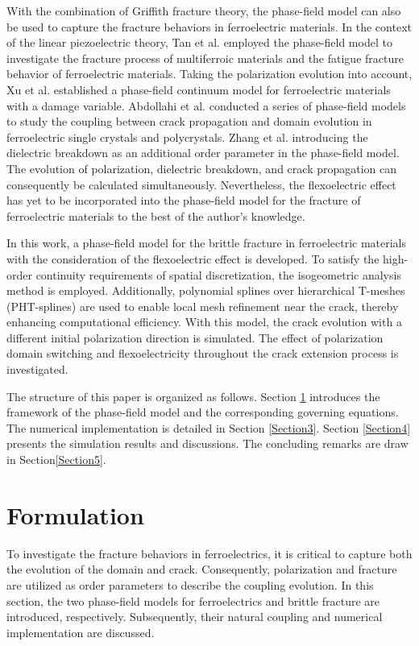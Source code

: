 \documentclass[final,times,fleqn,11pt]{elsarticle}
\begin{document}
With the combination of Griffith fracture theory, the phase-field model can also be used to capture the fracture behaviors in ferroelectric materials. In the context of the linear piezoelectric theory, Tan et al. \cite{tan_phase_2023,tan_phase_2022} employed the phase-field model to investigate the fracture process of multiferroic materials  and the fatigue fracture behavior of ferroelectric materials. Taking the polarization evolution into account, Xu et al. \cite{xu_fracture_2010} established a phase-field continuum model for ferroelectric materials with a damage variable. Abdollahi et al. \cite{abdollahi_phase-field_2011,abdollahi_phase-field_2011-1,abdollahi_phase-field_2012,abdollahi_three-dimensional_2014} conducted a series of phase-field models to study the coupling between crack propagation and domain evolution in ferroelectric single crystals and polycrystals. Zhang et al. \cite{yong_zhang_phase_2022,zhang_jumping_2022} introducing the dielectric breakdown as an additional order parameter in the phase-field model. The evolution of polarization, dielectric breakdown, and crack propagation can consequently be calculated simultaneously. Nevertheless, the flexoelectric effect has yet to be incorporated into the phase-field model for the fracture of ferroelectric materials to the best of the author's knowledge.

In this work, a phase-field model for the brittle fracture in ferroelectric materials with the consideration of the flexoelectric effect is developed. To satisfy the high-order continuity requirements of spatial discretization, the isogeometric analysis method is employed. Additionally, polynomial splines over hierarchical T-meshes (PHT-splines) are used to enable local mesh refinement near the crack, thereby enhancing computational efficiency. With this model, the crack evolution with a different initial polarization direction is simulated. The effect of polarization domain switching and flexoelectricity throughout the crack extension process is investigated. 

The structure of this paper is organized as follows. Section \ref{Section2} introduces the framework of the phase-field model and the corresponding governing equations. The numerical implementation is detailed in Section \ref{Section3}. Section \ref{Section4} presents the simulation results and discussions. The concluding remarks are draw in Section\ref{Section5}.

\section{Formulation}\label{Section2}
To investigate the fracture behaviors in ferroelectrics, it is critical to capture both the evolution of the domain and crack. Consequently, polarization and fracture are utilized as order parameters to describe the coupling evolution.  In this section, the two phase-field models for ferroelectrics and brittle fracture are introduced, respectively. Subsequently, their natural coupling and numerical implementation are discussed.
\end{document}
